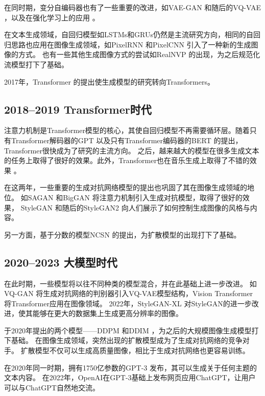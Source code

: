 在同时期，变分自编码器也有了一些重要的改进，如VAE-GAN {\cite{larsen2016autoencoding}}和随后的VQ-VAE {\cite{razavi2019generating}}，以及在强化学习上的应用 {\cite{ha2018world}}。

在文本生成领域，自回归模型如LSTMs和GRUs仍然是主流研究方向，相同的自回归思路也应用在图像生成领域，如PixelRNN {\cite{van2016pixel}}和PixelCNN {\cite{van2016conditional}}引入了一种新的生成图像的方式。
也有一些其他生成图像方式的尝试如RealNVP {\cite{dinh2016density}}的出现，为之后规范化流模型打下了基础。

2017年，Transformer {\cite{vaswani2017attention}}的提出使生成模型的研究转向Transformers。
\subsection{2018--2019 Transformer时代}
注意力机制是Transformer模型的核心，其使自回归模型不再需要循环层。随着只有Transformer解码器的GPT {\cite{radford2018improving}}以及只有Transformer编码器的BERT {\cite{devlin2018bert}}的提出，Transformer很快成为了研究的主流方向。
之后，越来越大的模型在很多生成文本的任务上取得了很好的效果。此外，Transformer也在音乐生成上取得了不错的效果 {\cite{huang2018music}}。

在这两年，一些重要的生成对抗网络模型的提出也巩固了其在图像生成领域的地位。
如SAGAN {\cite{zhang2019self}}和BigGAN {\cite{brock2018large}}将注意力机制引入生成对抗模型，取得了很好的效果，
StyleGAN {\cite{karras2019style}}和随后的StyleGAN2 {\cite{karras2020analyzing}}向人们展示了如何控制生成图像的风格与内容。

另一方面，基于分数的模型NCSN {\cite{song2019generative}}的提出，为扩散模型的出现打下了基础。
\subsection{2020--2023 大模型时代}
在此时期，一些模型将以往不同种类的模型混合，并在此基础上进一步改进。
如VQ-GAN {\cite{esser2021taming}}将生成对抗网络的判别器引入VQ-VAE模型结构，Vision Transformer {\cite{dosovitskiy2020image}}将Transformer应用在图像领域。
2022年，StyleGAN-XL {\cite{sauer2022stylegan}}对StyleGAN的进一步改进，使其能够在更大的数据集上生成更高分辨率的图像。

于2020年提出的两个模型——DDPM {\cite{ho2020denoising}}和DDIM {\cite{song2020denoising}}，为之后的大规模图像生成模型打下基础。
在图像生成领域，突然出现的扩散模型成为了生成对抗网络的竞争对手。
扩散模型不仅可以生成高质量图像，相比于生成对抗网络也更容易训练。

在2020年同一时期，拥有1750亿参数的GPT-3 {\cite{brown2020language}}发布，其可以生成关于任何主题的文本内容。
在2022年，OpenAI在GPT-3基础上发布网页应用ChatGPT，让用户可以与ChatGPT自然地交流。

